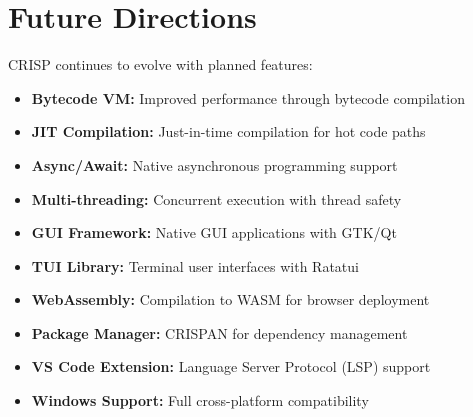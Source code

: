 \section{Future Directions}

CRISP continues to evolve with planned features:

\begin{tcolorbox}[colback=softviolet!20, colframe=softvioletdark, title=\textbf{\textcolor{darkpurple}{Planned Features}}, fonttitle=\bfseries, sharp corners]
\begin{itemize}
    \item \textbf{Bytecode VM:} Improved performance through bytecode compilation
    \item \textbf{JIT Compilation:} Just-in-time compilation for hot code paths
    \item \textbf{Async/Await:} Native asynchronous programming support
    \item \textbf{Multi-threading:} Concurrent execution with thread safety
    \item \textbf{GUI Framework:} Native GUI applications with GTK/Qt
    \item \textbf{TUI Library:} Terminal user interfaces with Ratatui
    \item \textbf{WebAssembly:} Compilation to WASM for browser deployment
    \item \textbf{Package Manager:} CRISPAN for dependency management
    \item \textbf{VS Code Extension:} Language Server Protocol (LSP) support
    \item \textbf{Windows Support:} Full cross-platform compatibility
\end{itemize}
\end{tcolorbox}
